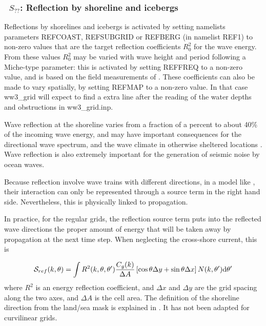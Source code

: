 \vsssub
\subsubsection{~$S_{??}$: Reflection by shoreline and icebergs} \label{sec:unknown}
\vsssub


\noindent 
Reflections by shorelines and icebergs is activated by setting namelists
parameters REFCOAST, REFSUBGRID or REFBERG (in namelist REF1) to non-zero
values that are the target reflection coefficients $R_0^2$ for the wave
energy.  From these values $R_0^2$ may be varied with wave height and period
following a Miche-type parameter: this is activated by setting REFFREQ to a
non-zero value, and is based on the field measurements of \cite{art:EHG94}.
These coefficients can also be made to vary spatially, by setting REFMAP to a
non-zero value. In that case ww3\_grid will expect to find a extra line after
the reading of the water depths and obstructions in ww3\_grid.inp.

Wave reflection at the shoreline varies from a fraction of a percent to about
40\% of the incoming wave energy, and may have important consequences for the
directional wave spectrum, and the wave climate in otherwise sheltered
locations \citep{pro:ORe99}. Wave reflection is also extremely important for
the generation of seismic noise by ocean waves.

Because reflection involve wave trains with different directions, in a model
like \ws, their interaction can only be represented through a source term in
the right hand side. Nevertheless, this is physically linked to propagation.

In practice, for the regular grids, the reflection source term puts into the
reflected wave directions the proper amount of energy that will be taken away
by propagation at the next time step. When neglecting the cross-shore current,
this is

\begin{equation} 
{\cal S}_{ref}(k,\theta) = 
\int R^2(k,\theta,\theta') \frac{C_g(k)}{\Delta A} \left[\cos \theta \Delta y + \sin \theta  \Delta x \right] N(k,\theta') \mathrm{d} \theta'
\end{equation}
where $R^2$ is an energy reflection coefficient, and $\Delta x$ and $\Delta y$
are the grid spacing along the two axes, and $\Delta A$ is the cell area. The
definition of the shoreline direction from the land/sea mask is explained in
\cite{art:Aea11}. It has not been adapted for curvilinear grids.

